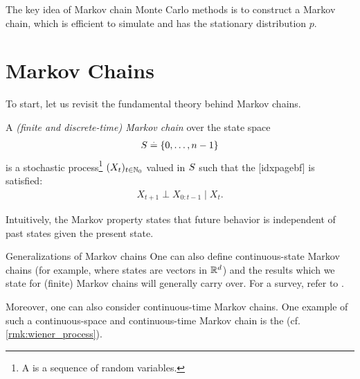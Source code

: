 The key idea of Markov chain Monte Carlo methods is to construct a Markov chain, which is efficient to simulate and has the stationary distribution $p$.

\section{Markov Chains}

To start, let us revisit the fundamental theory behind Markov chains.

\begin{defn}
  A \emph{(finite and discrete-time) Markov chain} over the state space \begin{align}
    S \overset{.}{=} \{0, \dots, n-1\}
  \end{align} is a stochastic process\footnote{A  is a sequence of random variables.} $(X_t)_{t \in \mathbb{N}_0}$ valued in $S$ such that the [idxpagebf] is satisfied: \begin{align}
    X_{t+1} \perp X_{0:t-1} \mid X_t. \label{eq:markov_property}
  \end{align}
\end{defn}

\begin{marginfigure}
  \caption{Directed graphical model of a Markov chain.
  The random variable $X_{t+1}$ is conditionally independent of the random variables $X_{0:t-1}$ given $X_t$.}
\end{marginfigure}

Intuitively, the Markov property states that future behavior is independent of past states given the present state.

\begin{rmk}{Generalizations of Markov chains}{}
  One can also define continuous-state Markov chains (for example, where states are vectors in $\mathbb{R}^d$) and the results which we state for (finite) Markov chains will generally carry over.
  For a survey, refer to .

  Moreover, one can also consider continuous-time Markov chains.
  One example of such a continuous-space and continuous-time Markov chain is the  (cf. \cref{rmk:wiener_process}).
\end{rmk}

